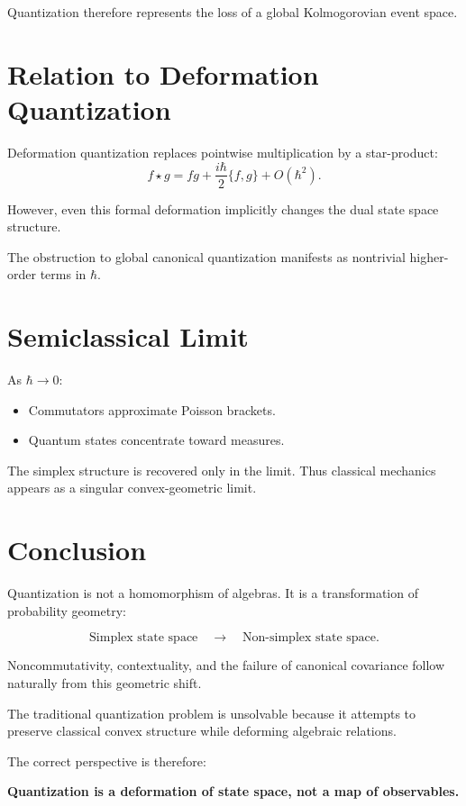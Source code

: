 \documentclass[11pt]{article}
\begin{document}
Quantization therefore represents the loss of a global Kolmogorovian event space.

\section{Relation to Deformation Quantization}

Deformation quantization replaces pointwise multiplication by
a star-product:
\[
f \star g = fg + \frac{i\hbar}{2}\{f,g\} + O(\hbar^2).
\]

However, even this formal deformation implicitly changes
the dual state space structure.

The obstruction to global canonical quantization
manifests as nontrivial higher-order terms in $\hbar$.

\section{Semiclassical Limit}

As $\hbar \to 0$:

\begin{itemize}
\item Commutators approximate Poisson brackets.
\item Quantum states concentrate toward measures.
\end{itemize}

The simplex structure is recovered only in the limit.
Thus classical mechanics appears as a singular convex-geometric limit.

\section{Conclusion}

Quantization is not a homomorphism of algebras.
It is a transformation of probability geometry:

\[
\text{Simplex state space}
\quad \longrightarrow \quad
\text{Non-simplex state space}.
\]

Noncommutativity,
contextuality,
and the failure of canonical covariance
follow naturally from this geometric shift.

The traditional quantization problem is unsolvable
because it attempts to preserve classical convex structure
while deforming algebraic relations.

The correct perspective is therefore:

\begin{center}
\textbf{Quantization is a deformation of state space,
not a map of observables.}
\end{center}
\end{document}
